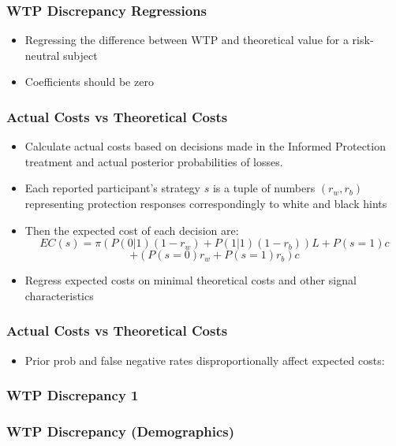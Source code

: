 \documentclass[11pt,hyperref={bookmarks=false}]{beamer}
\begin{document}
\begin{frame}
\frametitle{WTP Discrepancy Regressions}
\Large
\begin{itemize}
\item Regressing the difference between WTP and theoretical value for a risk-neutral subject
\item Coefficients should be zero
\end{itemize}
\normalsize
\end{frame}


\begin{frame}
\frametitle{Actual Costs vs Theoretical Costs}
\begin{itemize}
\item Calculate actual costs based on decisions made in the Informed Protection treatment and actual posterior probabilities of losses.
\item Each reported participant's strategy $s$ is a tuple of numbers $(r_w,r_b)$ representing protection responses correspondingly to white and black hints
\item Then the expected cost of each decision are:
\small
$$EC(s)=\pi (P(0|1)(1-r_w)+P(1|1)(1-r_b))L+P(s=1)c$$
$$+(P(s=0)r_w+P(s=1)r_b)c$$
\normalsize
\item Regress expected costs on minimal theoretical costs and other signal characteristics
\end{itemize}
\end{frame}


\begin{frame}
\frametitle{Actual Costs vs Theoretical Costs}
\begin{itemize}
\item Prior prob and false negative rates disproportionally affect expected costs:
\end{itemize}
\footnotesize

\end{frame}





\begin{frame}
\frametitle{WTP Discrepancy 1}

\footnotesize

\normalsize
\end{frame}


\begin{frame}
\frametitle{WTP Discrepancy (Demographics)}

\footnotesize

\normalsize
\end{frame}
\end{document}
